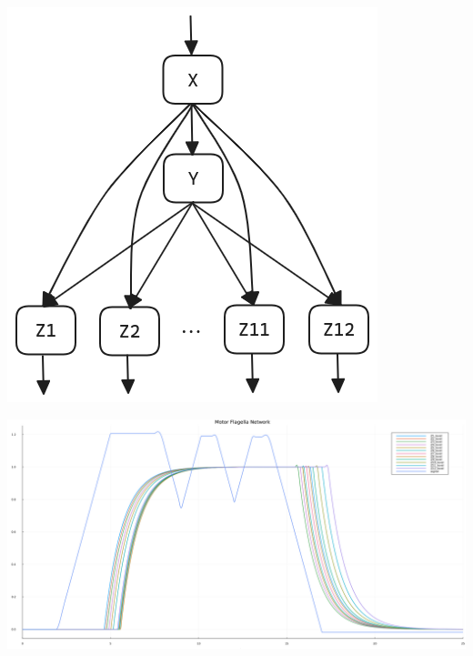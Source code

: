 \documentclass[12pt]{article}
\begin{document}
\begin{center}
    \includegraphics*[scale=0.35]{multioutput_FFL.png}
\end{center}

\begin{center}
    \includegraphics*[scale=0.25]{motor_flagella.png}
\end{center}




\nocite{*}




\end{document}
